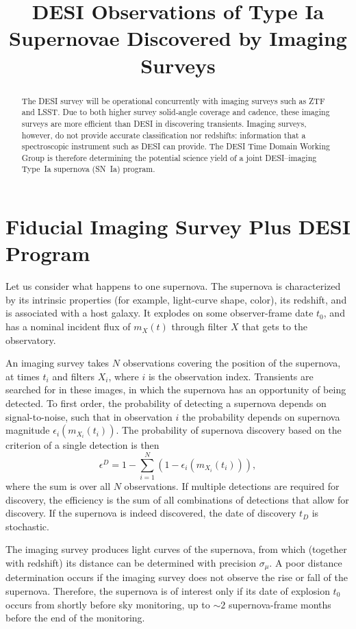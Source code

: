 \documentclass[onecolumn]{aastex61}   	%
\begin{document}
\title{DESI Observations of Type Ia Supernovae Discovered by Imaging Surveys}

\begin{abstract}
The DESI survey will be operational concurrently with imaging surveys such as ZTF and LSST.  Due to both higher survey solid-angle coverage and cadence, these imaging surveys are more
efficient than DESI in discovering transients.  Imaging surveys, however,
do not provide accurate classification nor redshifts: information that a spectroscopic instrument such as DESI can provide. The DESI Time Domain
Working Group is therefore determining the potential science yield of a joint DESI--imaging Type~Ia supernova (SN~Ia) program.
\end{abstract}

\section{Fiducial Imaging Survey Plus DESI Program}
Let us consider what happens to one supernova. The supernova is characterized by its intrinsic properties (for example, light-curve
shape, color), its redshift, and is associated with a host galaxy.  It explodes on some observer-frame date $t_0$, and has
a nominal incident flux of $m_X(t)$ through filter $X$ that gets to the observatory. 

An imaging survey takes $N$ observations covering the position of the supernova, at times $t_i$ and filters $X_i$, where $i$ is the observation index.
Transients are searched for in these images, in which the supernova has an opportunity of being detected.
To first order, the probability of detecting a supernova depends on signal-to-noise, such that
in observation $i$ the probability depends on supernova magnitude  $\epsilon_i(m_{X_i}(t_i))$.  The probability of supernova
discovery based on the criterion of a single detection is then
\begin{equation}
\epsilon^D = 1- \sum_{i=1}^{N} \left(1-\epsilon_i(m_{X_i}(t_i))\right),
\end{equation}
where the sum is over all $N$ observations.  If  multiple detections are required for discovery, the efficiency is the sum of all
combinations of detections that allow for discovery.
If the supernova is indeed discovered, the date of discovery $t_D$ is stochastic.  
 
The imaging survey produces light curves of the supernova, from which (together with redshift) its distance can be determined with precision $\sigma_\mu$.
A poor distance determination occurs if the imaging survey does not observe the rise or fall of the supernova.  Therefore,
the supernova is of interest only if its date of explosion $t_0$ occurs from shortly before sky monitoring, up to $\sim 2$ supernova-frame months
before the end of the monitoring. 
 
\end{document}
